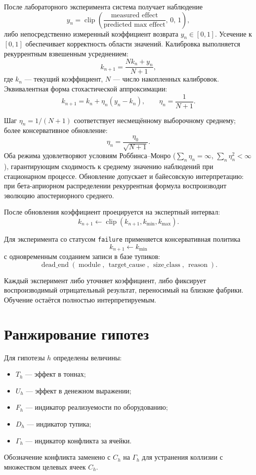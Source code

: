 \documentclass[12pt,a4paper]{article}
\newcommand{\code}[1]{\texttt{#1}}
\DeclareMathOperator{\clip}{clip}
\begin{document}
После лабораторного эксперимента система получает наблюдение
\[
  y_n =
  \clip\!\left(
  \frac{\text{measured effect}}{\text{predicted max effect}},\,0,\,1\right),
\]
либо непосредственно измеренный коэффициент возврата \(y_n \in [0,1]\).
Усечение к \([0,1]\) обеспечивает корректность области значений.
Калибровка выполняется рекуррентным взвешенным усреднением:
\[
  k_{n+1}
  =
  \frac{N k_n + y_n}{N+1},
\]
где \(k_n\) --- текущий коэффициент, \(N\) --- число накопленных калибровок.
Эквивалентная форма стохастической аппроксимации:
\[
  k_{n+1}
  =
  k_n + \eta_n(y_n-k_n),
  \qquad
  \eta_n = \frac{1}{N+1}.
\]

Шаг \(\eta_n = 1/(N+1)\) соответствует несмещённому выборочному среднему;
более консервативное обновление:
\[
  \eta_n = \frac{\eta_0}{\sqrt{N+1}}.
\]
Оба режима удовлетворяют условиям Роббинса--Монро
(\(\sum_n \eta_n = \infty\), \(\sum_n \eta_n^2 < \infty\)), гарантирующим
сходимость к среднему значению наблюдений при стационарном процессе.
Обновление допускает и байесовскую интерпретацию: при бета-априорном
распределении рекуррентная формула воспроизводит эволюцию апостериорного
среднего.

После обновления коэффициент проецируется на экспертный интервал:
\[
  k_{n+1}
  \leftarrow
  \clip(k_{n+1}, k_{\min}, k_{\max}).
\]

Для эксперимента со статусом \code{failure} применяется консервативная
политика
\[
  k_{n+1} \leftarrow k_{\min}
\]
с одновременным созданием записи в базе тупиков:
\[
  \operatorname{dead\_end}
  (\operatorname{module},\,\operatorname{target\_cause},\,
   \operatorname{size\_class},\,\operatorname{reason}).
\]

Каждый эксперимент либо уточняет коэффициент, либо фиксирует воспроизводимый
отрицательный результат, переносимый на близкие фабрики. Обучение остаётся
полностью интерпретируемым.

\section{Ранжирование гипотез}

Для гипотезы \(h\) определены величины:
\begin{itemize}
  \item \(T_h\) --- эффект в тоннах;
  \item \(U_h\) --- эффект в денежном выражении;
  \item \(F_h\) --- индикатор реализуемости по оборудованию;
  \item \(D_h\) --- индикатор тупика;
  \item \(\Gamma_h\) --- индикатор конфликта за ячейки.
\end{itemize}
Обозначение конфликта заменено с \(C_h\) на \(\Gamma_h\) для устранения
коллизии с множеством целевых ячеек \(C_h\).
\end{document}
